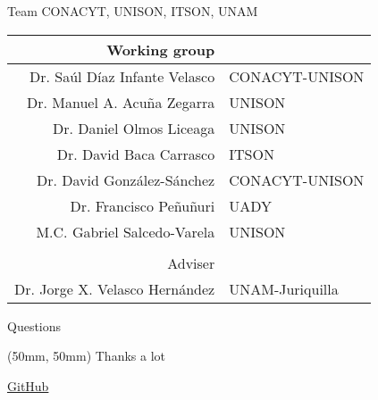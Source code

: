 \begin{frame}{Team CONACYT, UNISON, ITSON, UNAM }
    \begin{center}
        \begin{tabular}{rl}
            Working group
            \\
            \midrule
            Dr. Saúl Díaz Infante Velasco
            &
                CONACYT-UNISON
            \\
            Dr. Manuel A. Acu\~na Zegarra
            &
                UNISON
            \\
            Dr. Daniel Olmos Liceaga
            &
                UNISON
            \\
            Dr. David Baca Carrasco
            &
                ITSON
           \\
           Dr. David Gonz\'alez-S\'anchez
            &
            CONACYT-UNISON
           \\
           Dr. Francisco Pe\~nu\~nuri
           & UADY
           \\
            M.C. Gabriel Salcedo-Varela
            & UNISON
            \\
            \\
           Adviser
           \\
           \midrule
            Dr. Jorge X. Velasco Hern\'andez
            &
            UNAM-Juriquilla
            
        \end{tabular}
    \end{center}
\end{frame}
\begin{frame}{Questions}
    \begin{textblock*}{90mm}(50mm, 50mm)
        \Huge{Thanks a lot}
    \end{textblock*}
\end{frame}

\begin{frame}
    \href{https://github.com/SaulDiazInfante/Baemer-SIAM-Section-Mexico-second-annual-Metting.git}{GitHub}
    \\
\end{frame}
